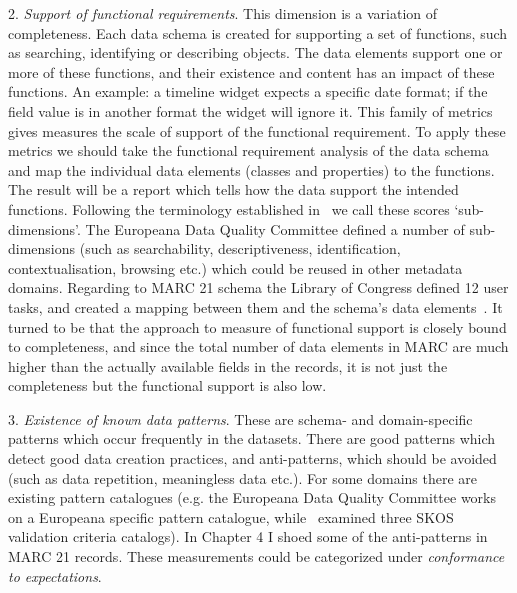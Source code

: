 2. \emph{Support of functional requirements}. This dimension is a variation of completeness. Each data schema is created for supporting a set of functions, such as searching, identifying or describing objects. The data elements support one or more of these functions, and their existence and content has an impact of these functions. An example: a timeline widget expects a specific date format; if the field value is in another format the widget will ignore it. This family of metrics gives measures the scale of support of the functional requirement. To apply these metrics we should take the functional requirement analysis of the data schema and map the individual data elements (classes and properties) to the functions. The result will be a report which tells how the data support the intended functions. Following the terminology established in~\cite{gavrilis2015} we call these scores `sub-dimensions’. The Europeana Data Quality Committee defined a number of sub-dimensions (such as searchability, descriptiveness, identification, contextualisation, browsing etc.) which could be reused in other metadata domains. Regarding to MARC 21 schema the Library of Congress defined 12 user tasks, and created a mapping between them and the schema's data elements~\cite{delsey2003, loc2006}. It turned to be that the approach to measure of functional support is closely bound to completeness, and since the total number of data elements in MARC are much higher than the actually available fields in the records, it is not just the completeness but the functional support is also low.

3. \emph{Existence of known data patterns}. These are schema- and domain-specific patterns which occur frequently in the datasets. There are good patterns which detect good data creation practices, and anti-patterns, which should be avoided (such as data repetition, meaningless data etc.). For some domains there are existing pattern catalogues (e.g. the Europeana Data Quality Committee works on a Europeana specific pattern catalogue, while~\cite{suominen2012}  examined three SKOS validation criteria catalogs). In Chapter 4 I shoed some of the anti-patterns in MARC 21 records. These measurements could be categorized under \emph{conformance to expectations}.

